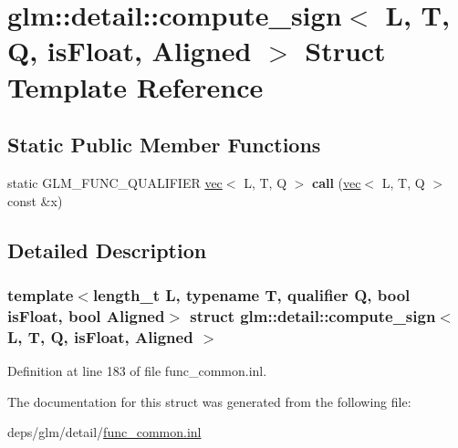 \hypertarget{structglm_1_1detail_1_1compute__sign}{}\section{glm\+:\+:detail\+:\+:compute\+\_\+sign$<$ L, T, Q, is\+Float, Aligned $>$ Struct Template Reference}
\label{structglm_1_1detail_1_1compute__sign}
\subsection*{Static Public Member Functions}
\begin{DoxyCompactItemize}
\item 
\mbox{\label{structglm_1_1detail_1_1compute__sign_a92a52e249fc740dd128d3b3b09bd0653}} 
static G\+L\+M\+\_\+\+F\+U\+N\+C\+\_\+\+Q\+U\+A\+L\+I\+F\+I\+ER \hyperlink{structglm_1_1vec}{vec}$<$ L, T, Q $>$ {\bfseries call} (\hyperlink{structglm_1_1vec}{vec}$<$ L, T, Q $>$ const \&x)
\end{DoxyCompactItemize}


\subsection{Detailed Description}
\subsubsection*{template$<$length\+\_\+t L, typename T, qualifier Q, bool is\+Float, bool Aligned$>$\newline
struct glm\+::detail\+::compute\+\_\+sign$<$ L, T, Q, is\+Float, Aligned $>$}



Definition at line 183 of file func\+\_\+common.\+inl.



The documentation for this struct was generated from the following file\+:\begin{DoxyCompactItemize}
\item 
deps/glm/detail/\hyperlink{func__common_8inl}{func\+\_\+common.\+inl}\end{DoxyCompactItemize}
